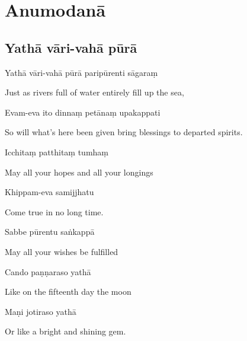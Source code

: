 \chapter{Anumodanā}

\section{Yathā vāri-vahā pūrā}



Yathā vāri-vahā pūrā paripūrenti sāgaraṃ

\begin{cprenglish}
  Just as rivers full of water entirely fill up the sea,
\end{cprenglish}

Evam-eva ito dinnaṃ petānaṃ upakappati

\begin{cprenglish}
  So will what's here been given bring blessings to departed spirits.\\
\end{cprenglish}

Icchitaṃ patthitaṃ tumhaṃ

\begin{cprenglish}
  May all your hopes and all your longings
\end{cprenglish}

Khippam-eva samijjhatu

\begin{cprenglish}
  Come true in no long time.
\end{cprenglish}

Sabbe pūrentu saṅkappā

\begin{cprenglish}
  May all your wishes be fulfilled
\end{cprenglish}

Cando paṇṇaraso yathā

\begin{cprenglish}
  Like on the fifteenth day the moon
\end{cprenglish}

Maṇi jotiraso yathā

\begin{cprenglish}
  Or like a bright and shining gem.\\
\end{cprenglish}

